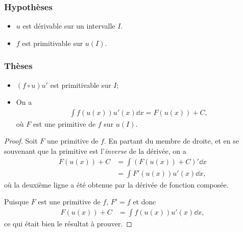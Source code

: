 \documentclass[main.tex]{subfiles}
\begin{document}
\begin{proposition}

    \subsubsection{Hypothèses}
    \begin{itemize}
        \item $u$ est dérivable sur un intervalle $I$.
        \item $f$ est primitivable sur $u(I)$.
    \end{itemize}

    \subsubsection{Thèses}
    \begin{itemize}
        \item $(f \circ u) u'$ est primitivable sur $I$;
        \item On a
            \begin{align}
                \int f(u(x)) u'(x) \dd x
                = F(u(x)) + C,
            \end{align}
            où $F$ est une primitive de $f$ sur $u(I)$.
    \end{itemize}
\end{proposition}
\begin{proof}
    Soit $F$ une primitive de $f$.
    En partant du membre de droite,
    et en se souvenant que la primitive est l'\emph{inverse} de la dérivée,
    on a
    \begin{align}
        F(u(x)) + C
        &= \int (F(u(x)) + C)' \dd x\\
        &= \int F'(u(x)) u'(x) \dd x,
    \end{align}
    où la deuxième ligne a été obtenue par la dérivée de fonction composée.

    Puisque $F$ est une primitive de $f$, $F' = f$ et donc
    \begin{align}
        F(u(x)) + C
        &= \int f(u(x)) u'(x) \dd x,
    \end{align}
    ce qui était bien le résultat à prouver.
\end{proof}
\end{document}
